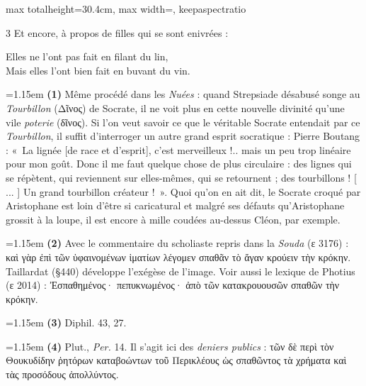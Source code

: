 \documentclass[11pt,twoside]{book}
\newcommand{\italique}[1]{\textit{#1}}
\newcommand{\citComm}[1]{\begin{quoting}[vskip=0.4pt,leftmargin=0.7em,rightmargin=0.2em]#1\end{quoting}}
\newcommand{\francais}[1]{{\policeFr #1}}
\begin{document}
\begin{adjustbox}{max totalheight=30.4cm, max width=\textwidth, keepaspectratio}
\begin{minipage}{\textwidth}
{\begin{multicols}{3}
\noindent Et encore, à propos de filles qui se sont enivrées :
\citComm{\francais{Elles ne l'ont pas fait en filant du lin,\\
Mais elles l'ont bien fait en buvant du vin.}}
\par\vspace{1.5pt}
\par\vspace{1.2pt}\par\nopagebreak\vspace{1pt}\noindent\hangindent=1.15em {\color{sepiaNote}\textbf{(1)}} Même procédé dans les \italique{Nuées} : quand Strepsiade désabusé songe au \italique{Tourbillon} (Δῖνος) de Socrate, il ne voit plus en cette nouvelle divinité qu'une vile \italique{poterie} (δῖνος). Si l'on veut savoir ce que le véritable Socrate entendait par ce \italique{Tourbillon}, il suffit d'interroger un autre grand esprit socratique : Pierre Boutang : «~La lignée [de race et d'esprit], c'est merveilleux !.. mais un peu trop linéaire pour mon goût. Donc il me faut quelque chose de plus circulaire : des lignes qui se répètent, qui reviennent sur elles-mêmes, qui se retournent ; des tourbillons ! [ ... ] Un grand tourbillon créateur !~». Quoi qu'on en ait dit, le Socrate croqué par Aristophane est loin d'être si caricatural et malgré ses défauts qu'Aristophane grossit à la loupe, il est encore à mille coudées au-dessus Cléon, par exemple.
\par\vspace{1.5pt}
\noindent\hangindent=1.15em {\color{sepiaNote}\textbf{(2)}} Avec le commentaire du scholiaste repris dans la \italique{Souda} (ε 3176) : καὶ γὰρ ἐπὶ τῶν ὑφαινομένων ἱματίων λέγομεν σπαθᾶν τὸ ἄγαν κρούειν τὴν κρόκην. Taillardat (§440) développe l'exégèse de l'image. Voir aussi le lexique de Photius (ε 2014) : Ἐσπαθημένος· πεπυκνωμένος· ἀπὸ τῶν κατακρουουσῶν σπαθῶν τὴν κρόκην.
\par\vspace{1.5pt}
\noindent\hangindent=1.15em {\color{sepiaNote}\textbf{(3)}} Diphil. 43, 27.
\par\vspace{1.5pt}
\noindent\hangindent=1.15em {\color{sepiaNote}\textbf{(4)}} Plut., \italique{Per.} 14. Il s'agit ici des \italique{deniers publics} : τῶν δὲ περὶ τὸν Θουκυδίδην ῥητόρων καταβοώντων τοῦ Περικλέους ὡς σπαθῶντος τὰ χρήματα καὶ τὰς προσόδους ἀπολλύντος.
\par\vspace{1.5pt}

\end{multicols}}
\end{minipage}
\end{adjustbox}
\end{document}
